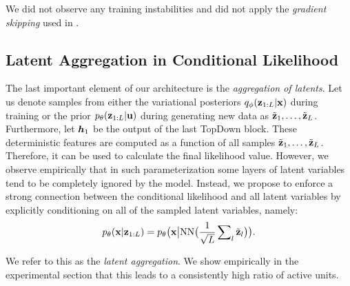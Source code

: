 We did not observe any training instabilities and did not apply the \textit{gradient skipping} used in \citet{Child2020-ze}.

 \subsection{Latent Aggregation in Conditional Likelihood} \label{subsec:latent_aggr}

The last important element of our architecture is the \textit{aggregation of latents}. Let us denote samples from either the variational posteriors $q_{\phi}({\mathbf{z}}_{1:L}|{\mathbf{x}})$ during training or the prior $p_{\theta}({\mathbf{z}}_{1:L}|{\mathbf{u}})$ during generating new data as $\tilde{{\mathbf{z}}}_1, \dots, \tilde{{\mathbf{z}}}_L$.  
Furthermore, let ${\bm{h}}_1$ be the output of the last TopDown block. 
These deterministic features are computed as a function of all samples $\tilde{{\mathbf{z}}}_1, \dots, \tilde{{\mathbf{z}}}_L$.
Therefore, it can be used to calculate the final likelihood value.
However, we observe empirically that in such parameterization some layers of latent variables tend to be completely ignored by the model.
Instead, we propose to enforce a strong connection between the conditional likelihood and all latent variables by explicitly conditioning on all of the sampled latent variables, namely: 
\begin{align} \label{eq:cond_like_ours}
    p_{\theta}(\rvx | \rvz_{1:L}) = p_{\theta}\big( \rvx \big| \text{NN}\big(\frac{1}{\sqrt{L}}\sum\nolimits_l \tilde{\rvz}_l\big) \big).
\end{align}

We refer to this as the \textit{latent aggregation}.
We show empirically in the experimental section that this leads to a consistently high ratio of active units. 




